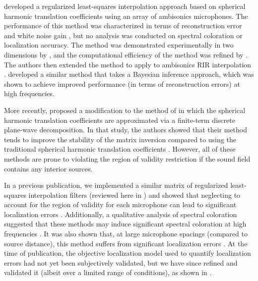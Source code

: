 \citet{Samarasinghe2014a} developed a regularized least-squares interpolation approach based on spherical harmonic translation coefficients using an array of ambisonics microphones.
The performance of this method was characterized in terms of reconstruction error and white noise gain \citep{Samarasinghe2014a}, but no analysis was conducted on spectral coloration or localization accuracy.
The method was demonstrated experimentally in two dimensions by \citet{Fan2014}, and the computational efficiency of the method was refined by \citet{Chen2015}.
The authors then extended the method to apply to ambisonics RIR interpolation \citep{Samarasinghe2015}.
\citet{Ueno2018} developed a similar method that takes a Bayesian inference approach, which was shown to achieve improved performance (in terms of reconstruction errors) at high frequencies.

More recently, \citet{WangChen2018} proposed a modification to the method of \citet{Samarasinghe2014a} in which the spherical harmonic translation coefficients are approximated via a finite-term discrete plane-wave decomposition.
In that study, the authors showed that their method tends to improve the stability of the matrix inversion compared to using the traditional spherical harmonic translation coefficients \citep[section IV]{WangChen2018}.
However, all of these methods are prone to violating the region of validity restriction if the sound field contains any interior sources.

In a previous publication, we implemented a similar matrix of regularized least-squares interpolation filters \citep[section 3.2]{TylkaChoueiri2016} (reviewed here in ) and showed that neglecting to account for the region of validity for each microphone can lead to significant localization errors \citep[Fig.~8b]{TylkaChoueiri2016}.
Additionally, a qualitative analysis of spectral coloration suggested that these methods may induce significant spectral coloration at high frequencies \citep[Fig.~4b]{TylkaChoueiri2016}.
It was also shown that, at large microphone spacings (compared to source distance), this method suffers from significant localization errors \citep[Fig.~6]{TylkaChoueiri2016}.
At the time of publication, the objective localization model used to quantify localization errors had not yet been subjectively validated, but we have since refined and validated it (albeit over a limited range of conditions), as shown in . %

